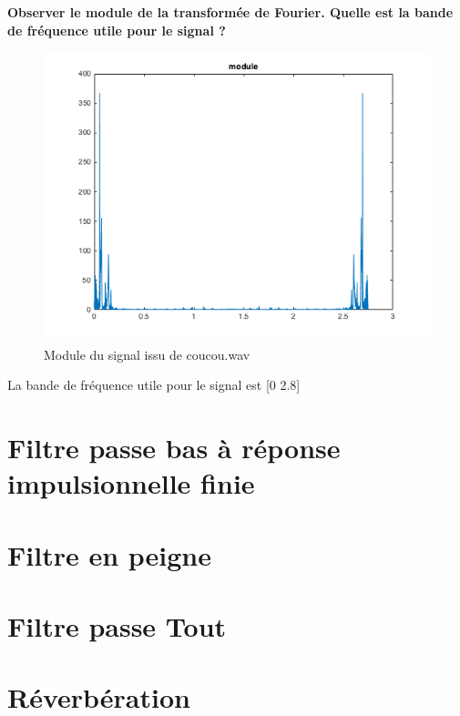 
\textbf{Observer le module de la transformée de Fourier. Quelle est la bande de fréquence utile pour le signal ?}
\begin{figure}[h]
\includegraphics [width=.9\linewidth]{./img/module}
\caption{Module du signal issu de coucou.wav}
\end{figure}

La bande de fréquence utile pour le signal est [0 2.8]
\section{Filtre passe bas à réponse impulsionnelle finie}


\section{Filtre en peigne}

\section{Filtre passe Tout}

\section{Réverbération}